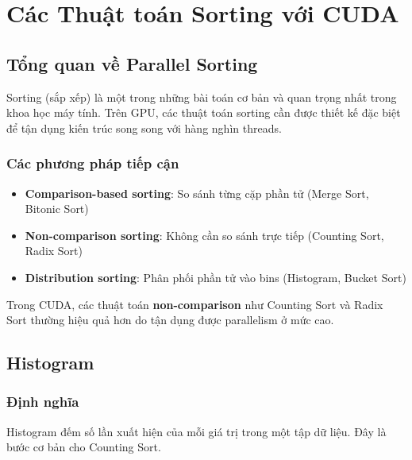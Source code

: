 \chapter{Các Thuật toán Sorting với CUDA}
\label{chap:sorting}

\section{Tổng quan về Parallel Sorting}

Sorting (sắp xếp) là một trong những bài toán cơ bản và quan trọng nhất trong khoa học máy tính. Trên GPU, các thuật toán sorting cần được thiết kế đặc biệt để tận dụng kiến trúc song song với hàng nghìn threads.

\subsection{Các phương pháp tiếp cận}

\begin{itemize}
    \item \textbf{Comparison-based sorting}: So sánh từng cặp phần tử (Merge Sort, Bitonic Sort)
    \item \textbf{Non-comparison sorting}: Không cần so sánh trực tiếp (Counting Sort, Radix Sort)
    \item \textbf{Distribution sorting}: Phân phối phần tử vào bins (Histogram, Bucket Sort)
\end{itemize}

Trong CUDA, các thuật toán \textbf{non-comparison} như Counting Sort và Radix Sort thường hiệu quả hơn do tận dụng được parallelism ở mức cao.

\section{Histogram}

\subsection{Định nghĩa}

Histogram đếm số lần xuất hiện của mỗi giá trị trong một tập dữ liệu. Đây là bước cơ bản cho Counting Sort.

